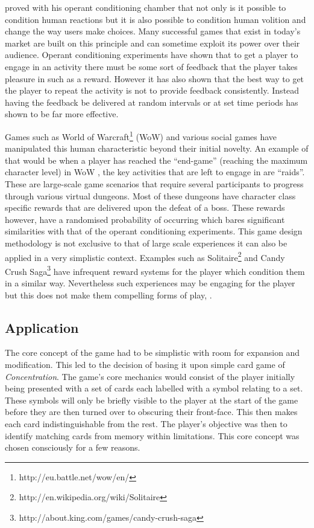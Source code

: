 \documentclass[final]{cmpreport}
\begin{document}
\cite{Skinner} proved with his operant conditioning chamber that not only is it possible to condition human reactions but it is also possible to condition human volition and change the way users make choices. Many successful games that exist in today's market are built on this principle and can sometime exploit its power over their audience. Operant conditioning experiments have shown that to get a player to engage in an activity there must be some sort of feedback that the player takes pleasure in such as a reward. However it has also shown that the best way to get the player to repeat the activity is not to provide feedback consistently. Instead having the feedback be delivered at random intervals or at set time periods has shown to be far more effective.

Games such as World of Warcraft\footnote{http://eu.battle.net/wow/en/} (WoW) and various social games have manipulated this human characteristic beyond their initial novelty. An example of that would be when a player has reached the ``end-game'' (reaching the maximum character level) in WoW , the key activities that are left to engage in are ``raids''. These are large-scale game scenarios that require several participants to progress through various virtual dungeons. Most of these dungeons have character class specific rewards that are delivered upon the defeat of a boss. These rewards however, have a randomised probability of occurring which bares significant similarities with that of the operant conditioning experiments. This game design methodology is not exclusive to that of large scale experiences it can also be applied in a very simplistic context. Examples such as Solitaire\footnote{http://en.wikipedia.org/wiki/Solitaire} and Candy Crush Saga\footnote{http://about.king.com/games/candy-crush-saga} have infrequent reward systems for the player which condition them in a similar way. Nevertheless such experiences may be engaging for the player but this does not make them compelling forms of play, \cite{ExtraCredits}.

\subsection{Application}
The core concept of the game had to be simplistic with room for expansion and modification. This led to the decision of basing it upon simple card game of \textit{Concentration\footnotemark}. The game's core mechanics would consist of the player initially being presented with a set of cards each labelled with a symbol relating to a set. These symbols will only be briefly visible to the player at the start of the game before they are then turned over to obscuring their front-face. This then makes each card indistinguishable from the rest. The player's objective was then to identify matching cards from memory within limitations. This core concept was chosen consciously for a few reasons.
\end{document}
